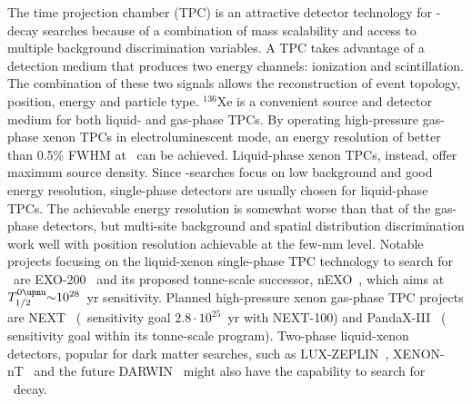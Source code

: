 \begin{description}[wide]
  \item[Time Projection Chambers] The time projection chamber (TPC) is an
    attractive detector technology for \onbb-decay searches because of a
    combination of mass scalability and access to multiple background
    discrimination variables. A TPC takes advantage of a detection medium that
    produces two energy channels: ionization and scintillation. The combination
    of these two signals allows the reconstruction of event topology, position,
    energy and particle type. $^{136}$Xe is a convenient source and detector
    medium for both liquid- and gas-phase TPCs. By operating high-pressure
    gas-phase xenon TPCs in electroluminescent mode, an energy resolution of
    better than 0.5\% FWHM at \qbb\ can be achieved. Liquid-phase xenon TPCs,
    instead, offer maximum source density. Since \onbb-searches focus on low
    background and good energy resolution, single-phase detectors are usually
    chosen for liquid-phase TPCs. The achievable energy resolution is somewhat
    worse than that of the gas-phase detectors, but multi-site background and
    spatial distribution discrimination work well with position resolution
    achievable at the few-mm level. Notable projects focusing on the
    liquid-xenon single-phase TPC technology to search for \onbb\ are
    EXO-200~\cite{Auger2012} and its proposed tonne-scale successor,
    nEXO~\cite{Kharusi2018}, which aims at $\thalfzeroM {\sim}10^{28}$~yr
    sensitivity.  Planned high-pressure xenon gas-phase TPC projects are
    NEXT~\cite{Lopez-March2017} (\thalfzero\ sensitivity goal $2.8 \cdot
    10^{25}$~yr with NEXT-100) and PandaX-III~\cite{Chen2016} (
    sensitivity goal within its tonne-scale program). Two-phase liquid-xenon
    detectors, popular for dark matter searches, such as
    LUX-ZEPLIN~\cite{Akerib2015}, XENON-nT~\cite{Aprile2017} and the future
    DARWIN~\cite{Aalbers2016} might also have the capability to search for
    \onbb\ decay.


\end{description}
